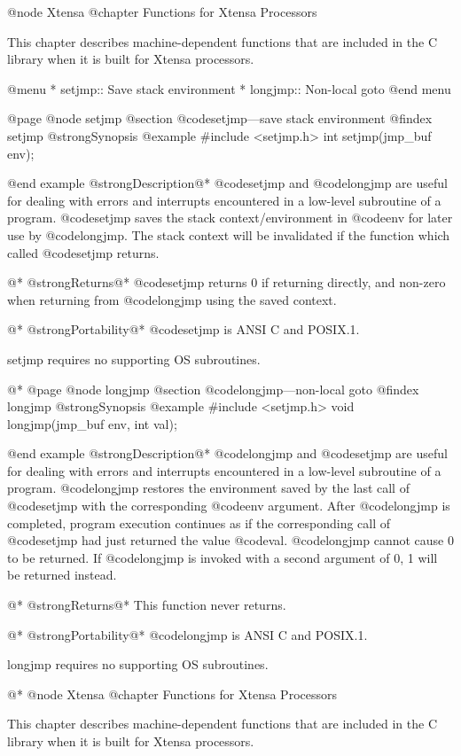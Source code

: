 @node Xtensa
@chapter Functions for Xtensa Processors

This chapter describes machine-dependent functions that are included
in the C library when it is built for Xtensa processors.

@menu
* setjmp::      Save stack environment
* longjmp::     Non-local goto
@end menu

@page
@node setjmp
@section @code{setjmp}---save stack environment
@findex setjmp
@strong{Synopsis}
@example
#include <setjmp.h>
int setjmp(jmp_buf env);

@end example
@strong{Description}@*
@code{setjmp} and @code{longjmp} are useful for dealing with errors
and interrupts encountered in a low-level subroutine of a program.
@code{setjmp} saves the stack context/environment in @code{env} for
later use by @code{longjmp}.  The stack context will be invalidated if
the function which called @code{setjmp} returns.

@*
@strong{Returns}@*
@code{setjmp} returns 0 if returning directly, and non-zero when
returning from @code{longjmp} using the saved context.

@*
@strong{Portability}@*
@code{setjmp} is ANSI C and POSIX.1.

setjmp requires no supporting OS subroutines.

@*
@page
@node longjmp
@section @code{longjmp}---non-local goto
@findex longjmp
@strong{Synopsis}
@example
#include <setjmp.h>
void longjmp(jmp_buf env, int val);

@end example
@strong{Description}@*
@code{longjmp} and @code{setjmp} are useful for dealing with errors
and interrupts encountered in a low-level subroutine of a program.
@code{longjmp} restores the environment saved by the last call of
@code{setjmp} with the corresponding @code{env} argument.  After
@code{longjmp} is completed, program execution continues as if the
corresponding call of @code{setjmp} had just returned the value
@code{val}.  @code{longjmp} cannot cause 0 to be returned.  If
@code{longjmp} is invoked with a second argument of 0, 1 will be
returned instead.

@*
@strong{Returns}@*
This function never returns.

@*
@strong{Portability}@*
@code{longjmp} is ANSI C and POSIX.1.

longjmp requires no supporting OS subroutines.

@*
@node Xtensa
@chapter Functions for Xtensa Processors

This chapter describes machine-dependent functions that are included
in the C library when it is built for Xtensa processors.

